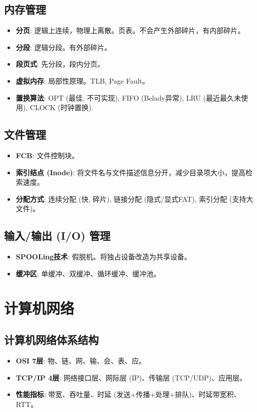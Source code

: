 \documentclass[cn,hazy,blue,12pt,screen,normal]{elegantnote}
\begin{document}
\subsection{内存管理}
\begin{itemize}
    \item \textbf{分页}: 逻辑上连续，物理上离散。页表。不会产生外部碎片，有内部碎片。
    \item \textbf{分段}: 逻辑分段。有外部碎片。
    \item \textbf{段页式}: 先分段，段内分页。
    \item \textbf{虚拟内存}: 局部性原理。TLB, Page Fault。
    \item \textbf{置换算法}: OPT (最佳, 不可实现), FIFO (Belady异常), LRU (最近最久未使用), CLOCK (时钟置换).
\end{itemize}

\subsection{文件管理}
\begin{itemize}
    \item \textbf{FCB}: 文件控制块。
    \item \textbf{索引结点 (Inode)}: 将文件名与文件描述信息分开，减少目录项大小，提高检索速度。
    \item \textbf{分配方式}: 连续分配 (快, 碎片), 链接分配 (隐式/显式FAT), 索引分配 (支持大文件)。
\end{itemize}

\subsection{输入/输出 (I/O) 管理}
\begin{itemize}
    \item \textbf{SPOOLing技术}: 假脱机。将独占设备改造为共享设备。
    \item \textbf{缓冲区}: 单缓冲、双缓冲、循环缓冲、缓冲池。
\end{itemize}

\section{计算机网络}

\subsection{计算机网络体系结构}
\begin{itemize}
    \item \textbf{OSI 7层}: 物、链、网、输、会、表、应。
    \item \textbf{TCP/IP 4层}: 网络接口层、网际层 (IP)、传输层 (TCP/UDP)、应用层。
    \item \textbf{性能指标}: 带宽、吞吐量、时延 (发送+传播+处理+排队)、时延带宽积、RTT。
\end{itemize}
\end{document}
